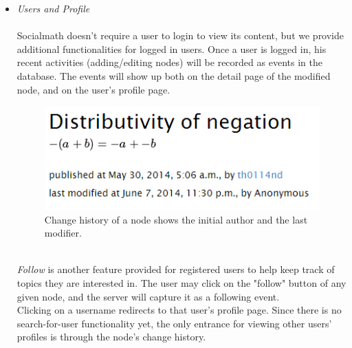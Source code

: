 \documentclass{acm_proc_article-sp}
\begin{document}
\begin{itemize}
\item \emph{Users and Profile} \\\\
Socialmath doesn't require a user to login to view its content, but we provide additional functionalities for logged in users. 
Once a user is logged in, his recent activities (adding/editing nodes) will be recorded as events in the database. The events will show up both on the detail page of the modified node, and on the user's profile page. \\
\begin{figure}[h!]
\centering
\includegraphics[scale=0.6]{edit_history.png}
\caption{Change history of a node shows the initial author and the last modifier.}
\end{figure}\\
\emph{Follow} is another feature provided for registered users to help keep track of topics they are interested in. The user may click on the "follow" button of any given node, and the server will capture it as a following event. \\
Clicking on a username redirects to that user's profile page. Since there is no search-for-user functionality yet, the only entrance for viewing other users' profiles is through the node's change history. 
\begin{figure}[h!]
\centering

\end{figure}
\end{itemize}
\end{document}
